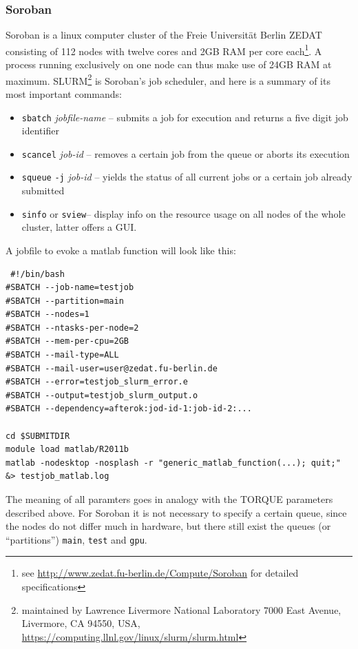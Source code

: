 \documentclass[11.5pt,a4paper]{article}
\begin{document}
\subsubsection{Soroban}
\label{sec-soroban}
Soroban is a linux computer cluster of the Freie Universit\"at Berlin ZEDAT consisting of 112 nodes with twelve cores and 2GB RAM per core each\footnote{see \url{http://www.zedat.fu-berlin.de/Compute/Soroban} for detailed specifications}. A process running exclusively on one node can thus make use of 24GB RAM at maximum. SLURM\footnote{maintained by Lawrence Livermore National Laboratory 7000 East Avenue, Livermore, CA 94550, USA, \url{https://computing.llnl.gov/linux/slurm/slurm.html}} is Soroban's job scheduler, and here is a summary of its most important commands:
\begin{itemize}
 \item \verb$sbatch$ \emph{jobfile-name} -- submits a job for execution and returns a five digit job identifier
  \item \verb$scancel$ \emph{job-id} -- removes a certain job from the queue or aborts its execution
  \item \verb$squeue$ {\verb$-j$ \emph{job-id}} -- yields the status of all current jobs {or a certain job already submitted}
  \item \verb$sinfo$ or \verb$sview$-- display info on the resource usage on all nodes of the whole cluster, latter offers a GUI.
\end{itemize}
A jobfile to evoke a matlab function will look like this:
\begin{lstlisting}
 #!/bin/bash 
#SBATCH --job-name=testjob
#SBATCH --partition=main
#SBATCH --nodes=1 
#SBATCH --ntasks-per-node=2 
#SBATCH --mem-per-cpu=2GB
#SBATCH --mail-type=ALL
#SBATCH --mail-user=user@zedat.fu-berlin.de 
#SBATCH --error=testjob_slurm_error.e
#SBATCH --output=testjob_slurm_output.o 
#SBATCH --dependency=afterok:jod-id-1:job-id-2:...

cd $SUBMITDIR
module load matlab/R2011b
matlab -nodesktop -nosplash -r "generic_matlab_function(...); quit;" &> testjob_matlab.log                                                                                   
\end{lstlisting}
The meaning of all paramters goes in analogy with the TORQUE parameters described above. For Soroban it is not necessary to specify a certain queue, since the nodes do not differ much in hardware, but there still exist the queues (or ``partitions'') \verb$main$, \verb$test$ and \verb$gpu$.
\end{document}
